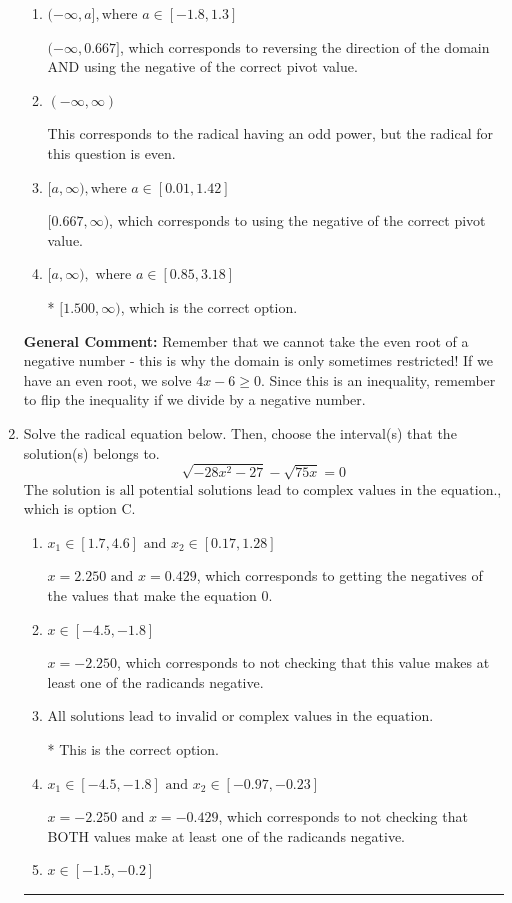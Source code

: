 \documentclass{extbook}[14pt]
\newcommand{\litem}[1]{\item #1

\rule{\textwidth}{0.4pt}}
\begin{document}
\begin{enumerate}
{\begin{enumerate}[label=\Alph*.]
 $(-\infty, 1.500]$, which corresponds to reversing the direction of the domain.
\item \( (-\infty, a], \text{where } a \in [-1.8, 1.3] \)

$(-\infty, 0.667]$, which corresponds to reversing the direction of the domain AND using the negative of the correct pivot value.
\item \( (-\infty, \infty) \)

This corresponds to the radical having an odd power, but the radical for this question is even.
\item \( [a, \infty), \text{where } a \in [0.01, 1.42] \)

$[0.667, \infty)$, which corresponds to using the negative of the correct pivot value.
\item \( [a, \infty), \text{ where } a \in [0.85, 3.18] \)

* $[1.500, \infty)$, which is the correct option.
\end{enumerate}

\textbf{General Comment:} Remember that we cannot take the even root of a negative number - this is why the domain is only sometimes restricted! If we have an even root, we solve $4 x - 6 \geq 0$. Since this is an inequality, remember to flip the inequality if we divide by a negative number.
}
\litem{
Solve the radical equation below. Then, choose the interval(s) that the solution(s) belongs to.
\[ \sqrt{-28 x^2 - 27} - \sqrt{75 x} = 0 \]The solution is \( \text{all potential solutions lead to complex values in the equation.} \), which is option C.\begin{enumerate}[label=\Alph*.]
\item \( x_1 \in [1.7, 4.6] \text{ and } x_2 \in [0.17,1.28] \)

$x = 2.250 \text{ and } x = 0.429$, which corresponds to getting the negatives of the values that make the equation 0.
\item \( x \in [-4.5,-1.8] \)

$x = -2.250$, which corresponds to not checking that this value makes at least one of the radicands negative.
\item \( \text{All solutions lead to invalid or complex values in the equation.} \)

* This is the correct option.
\item \( x_1 \in [-4.5, -1.8] \text{ and } x_2 \in [-0.97,-0.23] \)

$x = -2.250 \text{ and } x = -0.429$, which corresponds to not checking that BOTH values make at least one of the radicands negative.
\item \( x \in [-1.5,-0.2] \)


\end{enumerate}}
\end{enumerate}
\end{document}
